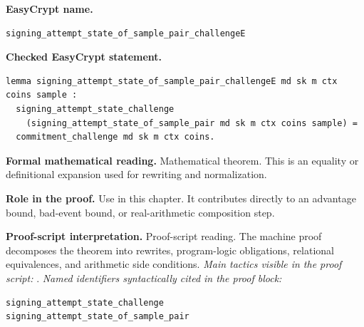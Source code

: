 \begin{formaltheorem}
\noindent\textbf{EasyCrypt name.}
\begin{lstlisting}[language=EasyCrypt,basicstyle=\ttfamily\scriptsize]
signing_attempt_state_of_sample_pair_challengeE
\end{lstlisting}
\noindent\textbf{Checked EasyCrypt statement.}
\begin{lstlisting}[language=EasyCrypt,basicstyle=\ttfamily\scriptsize]
lemma signing_attempt_state_of_sample_pair_challengeE md sk m ctx coins sample :
  signing_attempt_state_challenge
    (signing_attempt_state_of_sample_pair md sk m ctx coins sample) =
  commitment_challenge md sk m ctx coins.
\end{lstlisting}
\noindent\textbf{Formal mathematical reading.}
Mathematical theorem. This is an equality or definitional expansion used for rewriting and normalization.

\noindent\textbf{Role in the proof.}
Use in this chapter. It contributes directly to an advantage bound, bad-event bound, or real-arithmetic composition step.

\noindent\textbf{Proof-script interpretation.}
Proof-script reading. The machine proof decomposes the theorem into rewrites, program-logic obligations, relational equivalences, and arithmetic side conditions.
\emph{Main tactics visible in the proof script:} .
\emph{Named identifiers syntactically cited in the proof block:}
\begin{lstlisting}[language=EasyCrypt,basicstyle=\ttfamily\scriptsize]
signing_attempt_state_challenge
signing_attempt_state_of_sample_pair
\end{lstlisting}

\end{formaltheorem}

